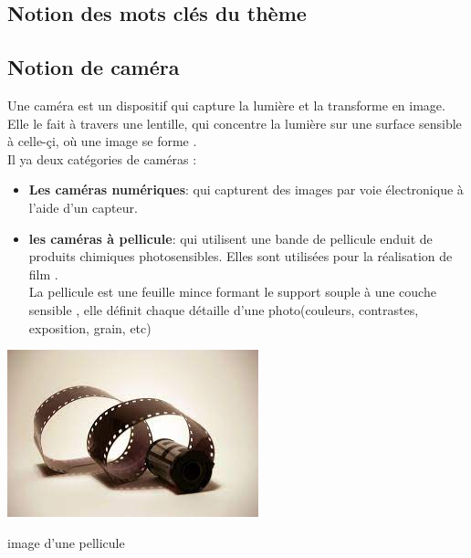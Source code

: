 \documentclass[12pt,a4paper]{report}
\begin{document}

\pagestyle{plain}%

\tableofcontents 

\listoffigures 

\listoftables












\begin{center}
	\section{ Notion des mots clés du thème}
\end{center}


	\subsection{Notion de caméra}


Une caméra est un dispositif qui capture la lumière et la transforme en image. Elle le fait à travers une lentille, qui concentre la lumière sur une surface sensible à celle-çi, où une image se forme \cite{noauthor_quest-ce_nodate}. \\

Il ya deux catégories de caméras :
\begin{itemize}
	\item \textbf{Les caméras numériques}: qui capturent des images par voie électronique à l’aide d’un capteur.
	\item\textbf{les caméras à pellicule}: qui utilisent une bande de pellicule enduit de produits chimiques photosensibles. Elles sont utilisées pour la réalisation de film .\\
	La pellicule est une feuille mince formant le support souple à une couche sensible , elle définit chaque détaille d'une photo(couleurs, contrastes, exposition, grain, etc)\\
\end{itemize}

\includegraphics[scale=1]{image/pellicule.jpeg}

image d'une pellicule\\








\newpage
 
\printbibliography[heading=bibintoc]
\end{document}
